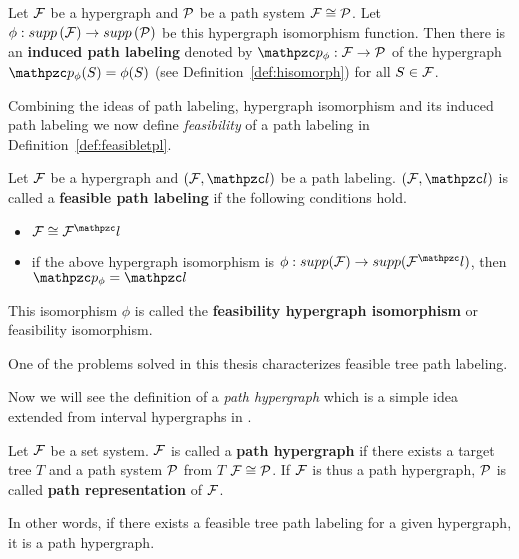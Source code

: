 \begin{definition}
  \label{def:inducedpl}
  Let ${\cal F}$ be a hypergraph and ${\cal P}$ be a path system \stt ${\cal F} \cong
  {\cal P}$. Let  $\phi: supp\left({\cal F}\right) \rightarrow supp\left({\cal P}\right)$ be this hypergraph
  isomorphism function. %
  Then there is an \textbf{induced path labeling} %
  denoted by $\cp_\phi: \cF \rightarrow \cP$
  of the hypergraph \stt %
  $\cp_\phi(S) = \phi(S)$
  (see Definition~\ref{def:hisomorph}) for all $S \in {\cal F}$.  
\end{definition}

Combining the ideas of path labeling, hypergraph isomorphism and its
induced path labeling we now define {\em feasibility} of a path
labeling in Definition~\ref{def:feasibletpl}.

\begin{definition}
  \label{def:feasibletpl}
  Let ${\cal F}$ be a hypergraph and $(\cF, \cl)$ be a path
  labeling. $(\cF, \cl)$ is called a \textbf{ feasible path labeling} if
  the following conditions hold.
  \begin{itemize}
  \item $\cF \cong \cF^\cl$
  \item if the above hypergraph isomorphism is $\phi: supp(\cF)
    \rightarrow supp(\cF^\cl)$, then $\cp_\phi = \cl$
  \end{itemize}


  This isomorphism $\phi$ is called the \textbf{feasibility hypergraph
  isomorphism} or feasibility isomorphism.
\end{definition}

One of the problems solved in this thesis \FTPL characterizes
feasible tree path labeling.

Now we will see the definition of a \emph{ path hypergraph} which is a
simple idea extended from interval hypergraphs in \cite{kklv10}. 

\begin{definition}
  \label{def:pathhypergraph}
  Let ${\cal F}$ be a set system. ${\cal F}$ is called a \textbf{path hypergraph}
  if there exists a target tree $T$ and a path system ${\cal P}$ from $T$
  \stt ${\cal F} \cong {\cal P}$. If ${\cal F}$ is thus a path hypergraph, ${\cal P}$ is
  called \textbf{path representation} of ${\cal F}$.
\end{definition}

In other words, if there exists a feasible tree path labeling for a
given hypergraph, it is a path hypergraph.


